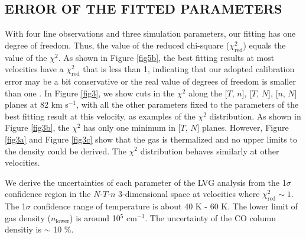 \subsection{ERROR OF THE FITTED PARAMETERS}
With four line observations and three simulation parameters, our fitting has one degree of freedom. Thus, the value of the reduced chi-square ($\chi^2_{\mathrm{red}}$) equals the value of the $\chi^2$. As shown in Figure \ref{fig5b}, the best fitting results at most velocities have a $\chi^2_{\mathrm{red}}$ that is less than 1, indicating that our adopted calibration error may be a bit conservative or the real value of degrees of freedom is smaller than one \citep{2010arXiv1012.3754A}. In Figure \ref{fig3}, we show cuts in the $\chi^2$ along the [$T$, $n$], [$T$, $N$], [$n$, $N$] planes at 82 km s$^{-1}$, with all the other parameters fixed to the parameters of the best fitting result at this velocity, as examples of the $\chi^2$ distribution. As shown in Figure \ref{fig3b}, the $\chi^2$ has only one minimum in [$T$, $N$] planes. However, Figure \ref{fig3a} and Figure \ref{fig3c} show that the gas is thermalized and no upper limits to the density could be derived. The $\chi^2$ distribution behaves similarly at other velocities. 

We derive the uncertainties of each parameter of the LVG analysis from the 1$\sigma$ confidence region in the $N$-$T$-$n$ 3-dimensional space at velocities where $\chi^2_{\mathrm{red}} \sim 1$. The 1$\sigma$ confidence range of temperature is about 40 K - 60 K. The lower limit of gas density ($n_{\mathrm{lower}}$) is around 10$^5$ cm$^{-3}$. The uncertainty of the CO column densitiy is $\sim$ 10 \%. 